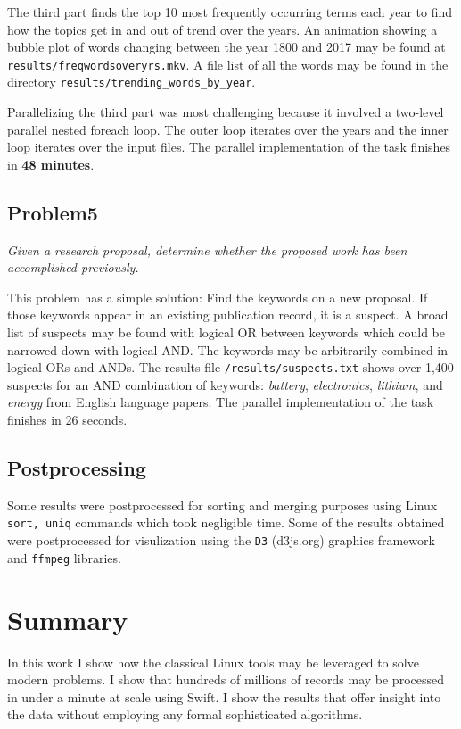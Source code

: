 \documentclass{article}
\begin{document}
The third part finds the top 10 most frequently occurring terms each year to
find how the topics get in and out of trend over the years. An animation
showing a bubble plot of words changing between the year 1800 and 2017 may be
found at \texttt{results/freqwordsoveryrs.mkv}. A file list of all the words
may be found in the directory \texttt{results/trending\_words\_by\_year}.

Parallelizing the third part was most challenging because it involved a
two-level parallel nested foreach loop.  The outer loop iterates over the years
and the inner loop iterates over the input files. The parallel implementation
of the task finishes in \textbf{48 minutes}.

\subsection*{Problem5}
\textit{Given a research proposal, determine whether the proposed work has been
accomplished previously.}

This problem has a simple solution: Find the keywords on a new proposal. If
those keywords appear in an existing publication record, it is a suspect. A
broad list of suspects may be found with logical OR between keywords which
could be narrowed down with logical AND. The keywords may be arbitrarily combined in
logical ORs and ANDs. The results file \texttt{/results/suspects.txt} shows
over 1,400 suspects for an AND combination of keywords:  \textit{battery},
\textit{electronics}, \textit{lithium}, and \textit{energy} from English
language papers. The parallel implementation of the task finishes in 26
seconds.

\subsection*{Postprocessing}
Some results were postprocessed for sorting and merging purposes using Linux
\texttt{sort, uniq} commands which took negligible time. Some of the results
obtained were postprocessed for visulization using the \texttt{D3} (d3js.org)
graphics framework and \texttt{ffmpeg} libraries.


\section*{Summary}
In this work I show how the classical Linux tools may be leveraged to solve
modern problems. I show that hundreds of millions of records may be processed
in under a minute at scale using Swift. I show the results that offer insight
into the data without employing any formal sophisticated algorithms.
\end{document}
